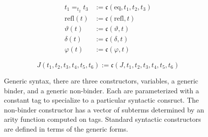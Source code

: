 \begin{figure}
\begin{minipage}{0.5\textwidth}
\begin{align*}
            t_1 =_{t_2} t_3 &:= \mathfrak{c}(\text{eq}, t_1, t_2, t_3) \\
            \text{refl}(t) &:= \mathfrak{c}(\text{refl}, t) \\
            \vartheta(t) &:= \mathfrak{c}(\vartheta, t) \\
            \delta(t) &:= \mathfrak{c}(\delta, t) \\
            \varphi(t) &:= \mathfrak{c}(\varphi, t)
        \end{align*}
    \end{minipage}
    \vspace{-.05in}
    $$J(t_1, t_2, t_3, t_4, t_5, t_6) := \mathfrak{c}(J, t_1, t_2, t_3, t_4, t_5, t_6)$$
    \caption{Generic syntax, there are three constructors, variables, a generic binder, and a generic non-binder. Each are parameterized with a constant tag to specialize to a particular syntactic consruct. The non-binder constructor has a vector of subterms determined by an arity function computed on tags. Standard syntactic constructors are defined in terms of the generic forms.}
\end{figure}
